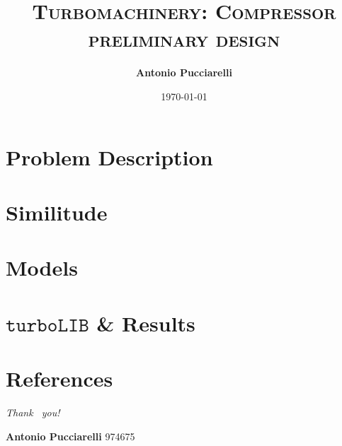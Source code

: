\documentclass{beamer}
\author{\textbf{Antonio Pucciarelli}}
\title{\textsc{Turbomachinery: Compressor preliminary design}}
\institute{Politecnico di Milano}
\date{\today}
\begin{document}
	\begin{frame}
    		\titlepage
    	\end{frame}

	\section{Problem Description}
        
        
	\section{Similitude}
        
    
   	\section{Models}
        
	
	\section{$\mathtt{turboLIB}$ \& Results}
	

	    
	\section{References}
		
			\begin{frame}[allowframebreaks]
%        			
        			
			\end{frame}
	\begin{frame}
		\begin{center}
			{\Huge \emph {\textrm{Thank  ~you!}}}
		\end{center}
		
		\vspace{4cm}
		
		\Large{\textbf{Antonio Pucciarelli}        \hfill 974675} \\ 
        
	\end{frame}
\end{document}
